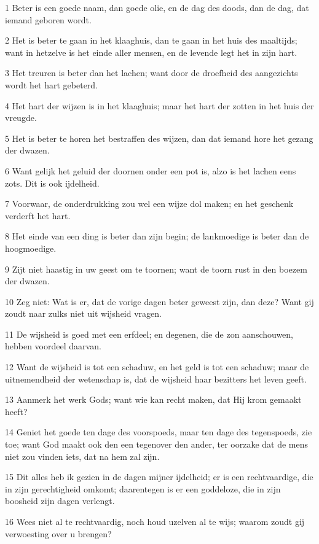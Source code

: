 \par 1 Beter is een goede naam, dan goede olie, en de dag des doods, dan de dag, dat iemand geboren wordt.
\par 2 Het is beter te gaan in het klaaghuis, dan te gaan in het huis des maaltijds; want in hetzelve is het einde aller mensen, en de levende legt het in zijn hart.
\par 3 Het treuren is beter dan het lachen; want door de droefheid des aangezichts wordt het hart gebeterd.
\par 4 Het hart der wijzen is in het klaaghuis; maar het hart der zotten in het huis der vreugde.
\par 5 Het is beter te horen het bestraffen des wijzen, dan dat iemand hore het gezang der dwazen.
\par 6 Want gelijk het geluid der doornen onder een pot is, alzo is het lachen eens zots. Dit is ook ijdelheid.
\par 7 Voorwaar, de onderdrukking zou wel een wijze dol maken; en het geschenk verderft het hart.
\par 8 Het einde van een ding is beter dan zijn begin; de lankmoedige is beter dan de hoogmoedige.
\par 9 Zijt niet haastig in uw geest om te toornen; want de toorn rust in den boezem der dwazen.
\par 10 Zeg niet: Wat is er, dat de vorige dagen beter geweest zijn, dan deze? Want gij zoudt naar zulks niet uit wijsheid vragen.
\par 11 De wijsheid is goed met een erfdeel; en degenen, die de zon aanschouwen, hebben voordeel daarvan.
\par 12 Want de wijsheid is tot een schaduw, en het geld is tot een schaduw; maar de uitnemendheid der wetenschap is, dat de wijsheid haar bezitters het leven geeft.
\par 13 Aanmerk het werk Gods; want wie kan recht maken, dat Hij krom gemaakt heeft?
\par 14 Geniet het goede ten dage des voorspoeds, maar ten dage des tegenspoeds, zie toe; want God maakt ook den een tegenover den ander, ter oorzake dat de mens niet zou vinden iets, dat na hem zal zijn.
\par 15 Dit alles heb ik gezien in de dagen mijner ijdelheid; er is een rechtvaardige, die in zijn gerechtigheid omkomt; daarentegen is er een goddeloze, die in zijn boosheid zijn dagen verlengt.
\par 16 Wees niet al te rechtvaardig, noch houd uzelven al te wijs; waarom zoudt gij verwoesting over u brengen?
